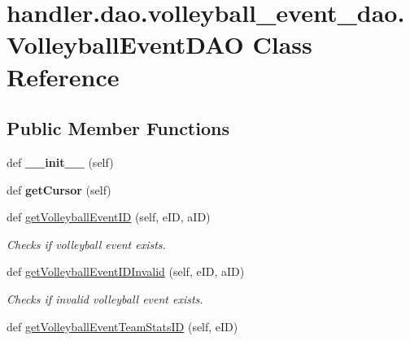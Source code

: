 \hypertarget{classhandler_1_1dao_1_1volleyball__event__dao_1_1_volleyball_event_d_a_o}{}\section{handler.\+dao.\+volleyball\+\_\+event\+\_\+dao.\+Volleyball\+Event\+D\+AO Class Reference}
\label{classhandler_1_1dao_1_1volleyball__event__dao_1_1_volleyball_event_d_a_o}
\subsection*{Public Member Functions}
\begin{DoxyCompactItemize}
\item 
\mbox{\label{classhandler_1_1dao_1_1volleyball__event__dao_1_1_volleyball_event_d_a_o_a54a7e5821b705a262b57a76dba3e4508}} 
def {\bfseries \+\_\+\+\_\+init\+\_\+\+\_\+} (self)
\item 
\mbox{\label{classhandler_1_1dao_1_1volleyball__event__dao_1_1_volleyball_event_d_a_o_a5eedeebc2382a169dde84736590b9bea}} 
def {\bfseries get\+Cursor} (self)
\item 
def \hyperlink{classhandler_1_1dao_1_1volleyball__event__dao_1_1_volleyball_event_d_a_o_a98ba628ab39ff88b057cdc8b90941c9f}{get\+Volleyball\+Event\+ID} (self, e\+ID, a\+ID)
\begin{DoxyCompactList}\small\item\em Checks if volleyball event exists. \end{DoxyCompactList}\item 
def \hyperlink{classhandler_1_1dao_1_1volleyball__event__dao_1_1_volleyball_event_d_a_o_ac857bf28aa93ba2eddd0d8f1e4403464}{get\+Volleyball\+Event\+I\+D\+Invalid} (self, e\+ID, a\+ID)
\begin{DoxyCompactList}\small\item\em Checks if invalid volleyball event exists. \end{DoxyCompactList}\item 
def \hyperlink{classhandler_1_1dao_1_1volleyball__event__dao_1_1_volleyball_event_d_a_o_ade320af1759dd84bf615c88cd28126f8}{get\+Volleyball\+Event\+Team\+Stats\+ID} (self, e\+ID)

\end{DoxyCompactItemize}
